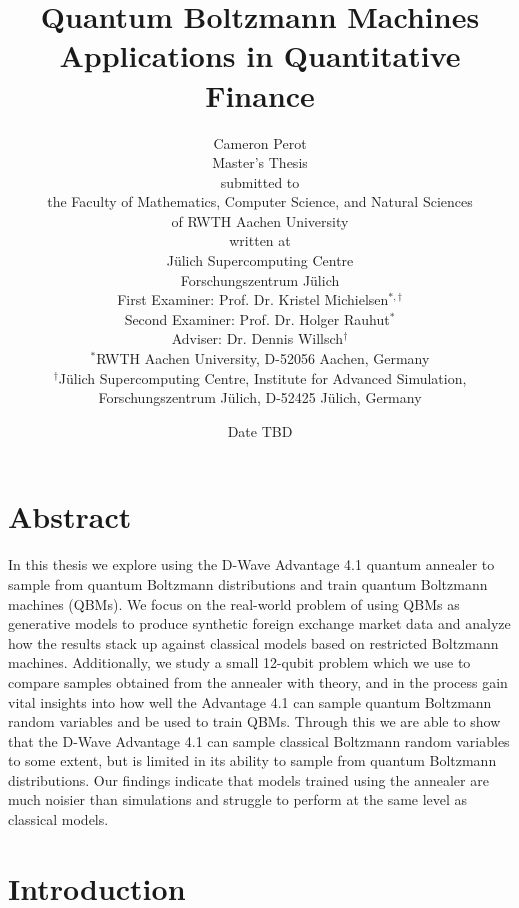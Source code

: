 \documentclass[11pt,twoside]{report}
\title{
    {Quantum Boltzmann Machines}\\
    {\large Applications in Quantitative Finance}
}
\author{
    {\LARGE Cameron Perot\vspace{1cm}}\\
    {Master's Thesis\vspace{0.1cm}}\\
    {\small submitted to\vspace{0.1cm}}\\
    {the Faculty of Mathematics, Computer Science, and Natural Sciences}\\
    {of RWTH Aachen University\vspace{0.1cm}}\\
    {\small written at\vspace{0.1cm}}\\
    {Jülich Supercomputing Centre}\\
    {Forschungszentrum Jülich\vspace{1cm}}\\
    {First Examiner: Prof. Dr. Kristel Michielsen\( ^{*,\dag} \)}\\
    {Second Examiner: Prof. Dr. Holger Rauhut\( ^* \)}\\
    {Adviser: Dr. Dennis Willsch\( ^\dag \)\vspace{0.1cm}}\\
    {\footnotesize\( ^* \)RWTH Aachen University, D-52056 Aachen, Germany}\\
    {\footnotesize\( ^\dag \)Jülich Supercomputing Centre, Institute for Advanced Simulation,}\\
    {\footnotesize Forschungszentrum Jülich, D-52425 Jülich, Germany\vspace{0.5cm}}
}
\date{Date TBD}
\begin{document}
\maketitle
{}

\clearpage\shipout\null
\chapter*{Abstract}

In this thesis we explore using the D-Wave Advantage 4.1 quantum annealer to sample from quantum Boltzmann distributions and train quantum Boltzmann machines (QBMs).
We focus on the real-world problem of using QBMs as generative models to produce synthetic foreign exchange market data and analyze how the results stack up against classical models based on restricted Boltzmann machines.
Additionally, we study a small 12-qubit problem which we use to compare samples obtained from the annealer with theory, and in the process gain vital insights into how well the Advantage 4.1 can sample quantum Boltzmann random variables and be used to train QBMs.
Through this we are able to show that the D-Wave Advantage 4.1 can sample classical Boltzmann random variables to some extent, but is limited in its ability to sample from quantum Boltzmann distributions.
Our findings indicate that models trained using the annealer are much noisier than simulations and struggle to perform at the same level as classical models.

\newpage\thispagestyle{empty}\mbox{}\newpage

\tableofcontents

\chapter{Introduction}
\label{ch:introduction}


\end{document}
